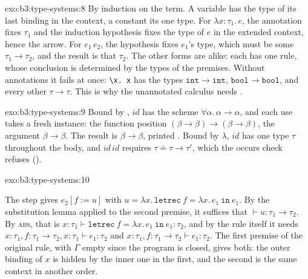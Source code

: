 \begin{solution}{exo:b3:type-systems:8}
By induction on the term. A variable has the type of its last binding in the context, a constant its one type. For $\lambda x{:}\tau_1.\,e$, the annotation fixes $\tau_1$ and the induction hypothesis fixes the type of $e$ in the extended context, hence the arrow. For $e_1\,e_2$, the hypothesis fixes $e_1$'s type, which must be some $\tau_1 \to \tau_2$, and the result is that $\tau_2$. The other forms are alike: each has one rule, whose conclusion is determined by the types of the premises. Without annotations it fails at once: \texttt{\textbackslash{}x.\ x} has the types $\mathtt{int} \to \mathtt{int}$, $\mathtt{bool} \to \mathtt{bool}$, and every other $\tau \to \tau$. This is why the unannotated calculus needs .
\end{solution}

\begin{solution}{exo:b3:type-systems:9}
Bound by , $\mathit{id}$ has the scheme $\forall \alpha.\,\alpha \to \alpha$, and each use takes a fresh instance: the function position $(\beta \to \beta) \to (\beta \to \beta)$, the argument $\beta \to \beta$. The result is $\beta \to \beta$, printed . Bound by $\lambda$, $\mathit{id}$ has one type $\tau$ throughout the body, and $\mathit{id}\,\mathit{id}$ requires $\tau \doteq \tau \to \tau'$, which the occurs check refuses ().
\end{solution}

\begin{solution}{exo:b3:type-systems:10}
\begin{mathpar}
\end{mathpar}
The step gives $e_2[f := u]$ with $u = \lambda x.\,\mathtt{letrec}\ f = \lambda x.\,e_1\ \mathtt{in}\ e_1$. By the substitution lemma applied to the second premise, it suffices that $\vdash u : \tau_1 \to \tau_2$. By \textsc{abs}, that is $x : \tau_1 \vdash \mathtt{letrec}\ f = \lambda x.\,e_1\ \mathtt{in}\ e_1 : \tau_2$, and by the rule itself it needs $x : \tau_1, f : \tau_1 \to \tau_2, x : \tau_1 \vdash e_1 : \tau_2$ and $x : \tau_1, f : \tau_1 \to \tau_2 \vdash e_1 : \tau_2$. The first premise of the original rule, with $\Gamma$ empty since the program is closed, gives both: the outer binding of $x$ is hidden by the inner one in the first, and the second is the same context in another order.
\end{solution}


